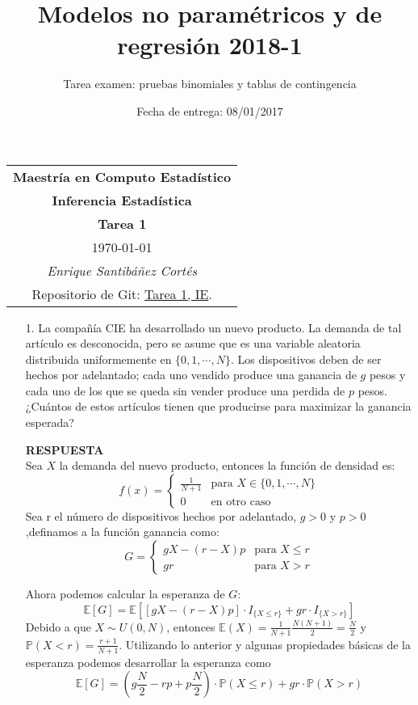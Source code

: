 \documentclass[11pt,letterpaper]{article}
\title{Modelos no paramétricos y de regresión 2018-1}
\author{Tarea examen: pruebas binomiales y tablas de contingencia}
\date{Fecha de entrega: 08/01/2017}
\newcommand{\mP}{\mathbb{P}}
\newcommand{\mE}{\mathbb{E}}
\newcommand{\res}{\textbf{RESPUESTA}\\}
\begin{document}
\begin{table}[ht]
\centering
\begin{tabular}{c}
\textbf{Maestría en Computo Estadístico}\\
\textbf{Inferencia Estadística} \\
\textbf{Tarea 1}\\
\today \\
\emph{Enrique Santibáñez Cortés}\\
Repositorio de Git: \href{https://github.com/Enriquesec/Inferencia_Estad-stica/tree/master/Tareas/Tarea_1}{Tarea 1, IE}.
\end{tabular}
\end{table}
\begin{itemize}
\item[1.] La compañía CIE ha desarrollado un nuevo producto. La demanda de tal artículo es desconocida, pero se asume que es una variable aleatoria distribuida uniformemente en $\{0, 1, \cdots, N \}$.
Los dispositivos deben de ser hechos por adelantado; cada uno vendido produce una ganancia de $g$ pesos y cada uno de los que se queda sin vender produce una perdida de $p$ pesos.
¿Cuántos de estos artículos tienen que producirse para maximizar la ganancia esperada?

\res
Sea $X$ la demanda del nuevo producto, entonces la función de densidad es: 
\begin{equation*}
f(x) = \left\{\begin{array}{ll}
\frac{1}{N+1}& \text{para } X\in\{0,1,\cdots , N\}\\
0 & \text{en otro caso} 
\end{array} \right.
\end{equation*}
Sea r el número de dispositivos hechos por adelantado, $g>0$ y $p>0$,definamos a la función ganancia como:
\begin{equation*}
G = \left\{\begin{array}{ll}
gX-(r-X)p & \text{para } X\leq r\\
gr & \text{para } X>r
\end{array} \right.
\end{equation*}

Ahora podemos calcular la esperanza de $G$:
$$\mE[G]=\mE[[gX-(r-X)p]\cdot I_{\{X\leq r \}}+gr\cdot I_{\{X >r\}}] $$
Debido a que $X\sim U(0,N)$, entonces $\mE(X)=\frac{1}{N+1}\frac{N(N+1)}{2}=\frac{N}{2}$ y $\mP(X<r)=\frac{r+1}{N+1}$. Utilizando lo anterior y algunas propiedades básicas de la esperanza podemos desarrollar la esperanza como 
$$\mE[G]=\left( g\frac{N}{2}-rp+p\frac{N}{2}\right)\cdot\mP(X\leq r) +gr \cdot \mP(X>r)$$


\end{itemize}
\end{document}
